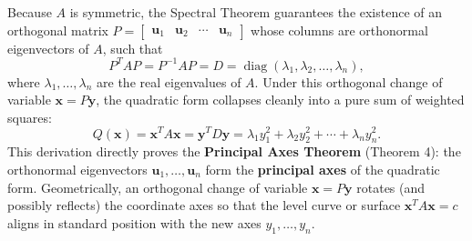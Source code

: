 \documentclass[11pt, letterpaper]{article}
\theoremstyle{definition}
\theoremstyle{remark}
\begin{document}
Because $A$ is symmetric, the Spectral Theorem guarantees the existence of an orthogonal matrix $P = \begin{bmatrix} \mathbf{u}_1 & \mathbf{u}_2 & \cdots & \mathbf{u}_n \end{bmatrix}$ whose columns are orthonormal eigenvectors of $A$, such that
\[
P^T A P = P^{-1} A P = D = \operatorname{diag}(\lambda_1, \lambda_2, \dots, \lambda_n),
\]
where $\lambda_1, \dots, \lambda_n$ are the real eigenvalues of $A$. Under this orthogonal change of variable $\mathbf{x} = P\mathbf{y}$, the quadratic form collapses cleanly into a pure sum of weighted squares:
\[
Q(\mathbf{x}) = \mathbf{x}^T A \mathbf{x} = \mathbf{y}^T D \mathbf{y} = \lambda_1 y_1^2 + \lambda_2 y_2^2 + \cdots + \lambda_n y_n^2.
\]
This derivation directly proves the \textbf{Principal Axes Theorem} (Theorem 4): the orthonormal eigenvectors $\mathbf{u}_1, \dots, \mathbf{u}_n$ form the \textbf{principal axes} of the quadratic form. Geometrically, an orthogonal change of variable $\mathbf{x} = P\mathbf{y}$ rotates (and possibly reflects) the coordinate axes so that the level curve or surface $\mathbf{x}^T A \mathbf{x} = c$ aligns in standard position with the new axes $y_1, \dots, y_n$.
\end{document}
